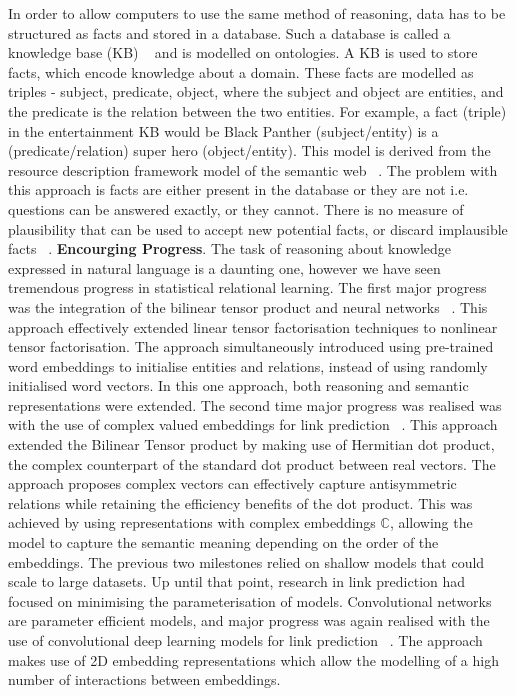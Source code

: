 In order to allow computers to use the same method of reasoning, data has to be structured as facts and stored in a database. Such a database is called a knowledge base (KB) ~\citep{carlson2010toward, angeli2013philosophers}  and is modelled on ontologies. A KB is used to store facts, which encode knowledge about a domain. These facts are modelled as triples - subject, predicate, object, where the subject and object are entities, and the predicate is the relation between the two entities. For example, a fact (triple) in the entertainment KB would be Black Panther (subject/entity) is a (predicate/relation) super hero (object/entity). This model is derived from the resource description framework model of the semantic web ~\citep{bizer2009dbpedia}. \newline
The problem with this approach is facts are either present in the database or they are not i.e. questions can be answered exactly, or they cannot. There is no measure of plausibility that can be used to accept new potential facts, or discard implausible facts ~\citep{koller2007introduction}. \newline
\textbf{Encourging Progress}. The task of reasoning about knowledge expressed in natural language is a daunting one, however we have seen tremendous progress in statistical relational learning. The first major progress was the integration of the bilinear tensor product and neural networks ~\citep{socher2013reasoning}. This approach effectively extended linear tensor factorisation techniques to nonlinear tensor factorisation. The approach simultaneously introduced using pre-trained word embeddings to initialise entities and relations, instead of using randomly initialised word vectors. In this one approach, both reasoning and semantic representations were extended. \newline
The second time major progress was realised was with the use of complex valued embeddings for link prediction ~\citep{trouillon2016complex}. This approach extended the Bilinear Tensor product by making use of Hermitian dot product, the complex counterpart of the standard dot product between real vectors. The approach proposes complex vectors can effectively capture antisymmetric relations while retaining the efficiency benefits of the dot product. This was achieved by using representations with complex embeddings $\mathbb{C}$, allowing the model to capture the semantic meaning depending on the order of the embeddings. \newline 
The previous two milestones relied on shallow models that could scale to large datasets. Up until that point, research in link prediction had focused on minimising the parameterisation of models. Convolutional networks are parameter efficient models, and major progress was again realised with the use of convolutional deep learning models for link prediction ~\citep{dettmers2018convolutional}. The approach makes use of 2D embedding representations which allow the modelling of a high number of interactions between embeddings. \newline 
